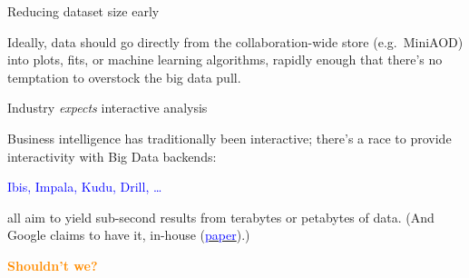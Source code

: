 \documentclass{beamer}
\begin{document}
\begin{frame}{Reducing dataset size early}
\begin{center}
\end{center}

Ideally, data should go directly from the collaboration-wide store (e.g.\ MiniAOD) into plots, fits, or machine learning algorithms, rapidly enough that there's no temptation to overstock the big data pull.
\end{frame}

\begin{frame}{Industry {\it expects} interactive analysis}

Business intelligence has traditionally been interactive; there's a race to provide interactivity with Big Data backends:

\begin{center}
\textcolor{blue}{Ibis, Impala, Kudu, Drill, \ldots}
\end{center}

all aim to yield sub-second results from terabytes or petabytes of data. (And Google claims to have it, in-house (\href{http://research.google.com/pubs/pub36632.html}{\textcolor{blue}{paper}}).)

\vfill
\textcolor{darkorange}{\bf Shouldn't we?}
\end{frame}
\end{document}
